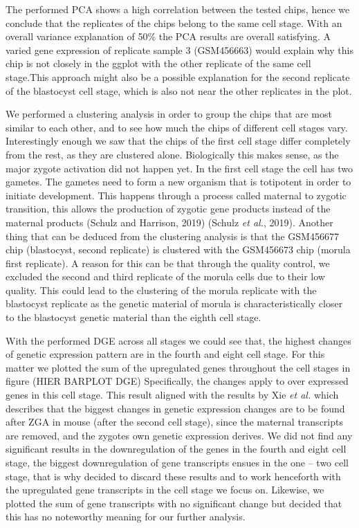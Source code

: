 \documentclass[
  parskip,
  oneside]{scrreprt}
\begin{document}
The performed PCA shows a high correlation between the tested chips,
hence we conclude that the replicates of the chips belong to the same
cell stage. With an overall variance explanation of 50\% the PCA results
are overall satisfying. A varied gene expression of replicate sample 3
(GSM456663) would explain why this chip is not closely in the ggplot
with the other replicate of the same cell stage.This approach might also
be a possible explanation for the second replicate of the blastocyst
cell stage, which is also not near the other replicates in the plot.

We performed a clustering analysis in order to group the chips that are
most similar to each other, and to see how much the chips of different
cell stages vary. Interestingly enough we saw that the chips of the
first cell stage differ completely from the rest, as they are clustered
alone. Biologically this makes sense, as the major zygote activation did
not happen yet. In the first cell stage the cell has two gametes. The
gametes need to form a new organism that is totipotent in order to
initiate development. This happens through a process called maternal to
zygotic transition, this allows the production of zygotic gene products
instead of the maternal products (Schulz and Harrison, 2019) (Schulz
\emph{et al.}, 2019). Another thing that can be deduced from the
clustering analysis is that the GSM456677 chip (blastocyst, second
replicate) is clustered with the GSM456673 chip (morula first
replicate). A reason for this can be that through the quality control,
we excluded the second and third replicate of the morula cells due to
their low quality. This could lead to the clustering of the morula
replicate with the blastocyst replicate as the genetic material of
morula is characteristically closer to the blastocyst genetic material
than the eighth cell stage.

With the performed DGE across all stages we could see that, the highest
changes of genetic expression pattern are in the fourth and eight cell
stage. For this matter we plotted the sum of the upregulated genes
throughout the cell stages in figure (HIER BARPLOT DGE) Specifically,
the changes apply to over expressed genes in this cell stage. This
result aligned with the results by Xie \emph{et al.} which describes
that the biggest changes in genetic expression changes are to be found
after ZGA in mouse (after the second cell stage), since the maternal
transcripts are removed, and the zygotes own genetic expression derives.
We did not find any significant results in the downregulation of the
genes in the fourth and eight cell stage, the biggest downregulation of
gene transcripts ensues in the one -- two cell stage, that is why
decided to discard these results and to work henceforth with the
upregulated gene transcripts in the cell stage we focus on. Likewise, we
plotted the sum of gene transcripts with no significant change but
decided that this has no noteworthy meaning for our further analysis.
\end{document}
